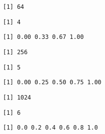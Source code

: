 \documentclass[
  letterpaper,
]{article}
\begin{document}
\begin{figure}

\begin{minipage}{0.23\linewidth}

\begin{verbatim}
[1] 64
\end{verbatim}

\end{minipage}%
%
\begin{minipage}{0.17\linewidth}

\begin{verbatim}
[1] 4
\end{verbatim}

\end{minipage}%
%
\begin{minipage}{0.60\linewidth}

\begin{verbatim}
[1] 0.00 0.33 0.67 1.00
\end{verbatim}

\end{minipage}%
\newline
\begin{minipage}{0.23\linewidth}

\begin{verbatim}
[1] 256
\end{verbatim}

\end{minipage}%
%
\begin{minipage}{0.17\linewidth}

\begin{verbatim}
[1] 5
\end{verbatim}

\end{minipage}%
%
\begin{minipage}{0.60\linewidth}

\begin{verbatim}
[1] 0.00 0.25 0.50 0.75 1.00
\end{verbatim}

\end{minipage}%
\newline
\begin{minipage}{0.23\linewidth}

\begin{verbatim}
[1] 1024
\end{verbatim}

\end{minipage}%
%
\begin{minipage}{0.17\linewidth}

\begin{verbatim}
[1] 6
\end{verbatim}

\end{minipage}%
%
\begin{minipage}{0.60\linewidth}

\begin{verbatim}
[1] 0.0 0.2 0.4 0.6 0.8 1.0
\end{verbatim}

\end{minipage}%

\end{figure}%
\end{document}
